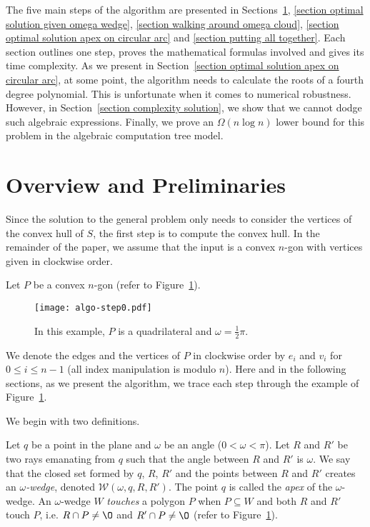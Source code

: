 \documentclass[11pt, oneside]{article}
\def\wedge{\mathcal{W}}
\begin{document}
The five main steps of the algorithm
are presented in Sections~\ref{section overview preliminaries}, 
\ref{section optimal solution given omega wedge}, 
\ref{section walking around omega cloud},
\ref{section optimal solution apex on circular arc}
and \ref{section putting all together}.
Each section outlines one step,
proves the mathematical formulas involved
and gives its time complexity.
As we present in Section~\ref{section optimal solution apex on circular arc},
at some point,
the algorithm needs to calculate the roots of a fourth degree polynomial.
This is unfortunate when it comes to numerical robustness.
However,
in Section~\ref{section complexity solution},
we show that we cannot dodge
such algebraic expressions.
Finally,
we prove an $\Omega(n \log n)$ lower bound for this problem
in the algebraic computation tree model.



\section{Overview and Preliminaries}
\label{section overview preliminaries}






Since the solution to the general problem 
only needs to consider the vertices
of the convex hull of $S$, 
the first step is to compute the convex hull.
In the remainder of the paper,
we assume that the input is a convex $n$-gon
with vertices given in clockwise order. 

Let $P$ be a convex $n$-gon
(refer to Figure~\ref{figure algo-step0}).
\begin{figure}
\centering
\texttt{[image: algo-step0.pdf]}
\caption{In this example,
$P$ is a quadrilateral
and $\omega=\frac{1}{2}\pi$.\label{figure algo-step0}}
\end{figure}
We denote the edges and the vertices of $P$
in clockwise order 
by $e_i$ and $v_i$ for $0\leq i \leq n-1$
(all index manipulation is modulo $n$).
Here and in the following sections,
as we present the algorithm,
we trace each step through the example of Figure~\ref{figure algo-step0}.

We begin with two definitions.
\begin{definition}
Let $q$ be a point in the plane
and $\omega$ be an angle 
($0<\omega<\pi$).
Let $R$ and $R'$ be two rays emanating from $q$
such that the angle between $R$ and $R'$ is $\omega$.
We say that the closed set formed by $q$, 
$R$, 
$R'$ 
and the points between $R$ and $R'$
creates an \emph{$\omega$-wedge},
denoted $\wedge(\omega,q,R,R')$.
The point $q$ is called the \emph{apex} of the $\omega$-wedge.
An $\omega$-wedge $W$ \emph{touches} a polygon $P$
when $P\subseteq W$ and both
$R$ and $R'$ touch $P$,
i.e. $R\cap P \neq {\O}$
and $R'\cap P \neq {\O}$
(refer to Figure~\ref{figure algo-step0}).
\end{definition}
\end{document}
